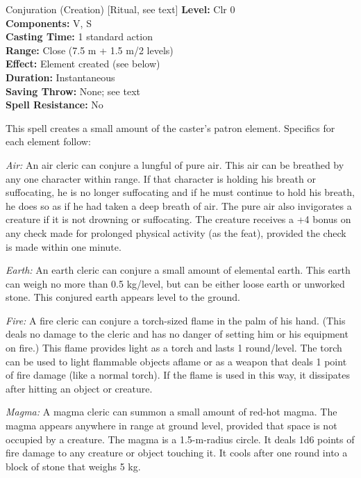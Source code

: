 {Conjuration (Creation) [Ritual, see text]}
{
	\textbf{Level:}
	Clr 0\\
	\textbf{Components:}
	V, S\\
	\textbf{Casting Time:}
	1 standard action\\
	\textbf{Range:}
	Close (7.5 m + 1.5 m/2 levels)\\
	\textbf{Effect:}
	Element created (see below)\\
	\textbf{Duration:}
	Instantaneous\\
	\textbf{Saving Throw:}
	None; see text\\
	\textbf{Spell Resistance:}
	No\\
}
{
	This spell creates a small amount of the caster's patron element. Specifics for each element follow:

	\textit{Air:} An air cleric can conjure a lungful of pure air. This air can be breathed by any one character within range. If that character is holding his breath or suffocating, he is no longer suffocating and if he must continue to hold his breath, he does so as if he had taken a deep breath of air. The pure air also invigorates a creature if it is not drowning or suffocating. The creature receives a +4 bonus on any check made for prolonged physical activity (as the  feat), provided the check is made within one minute.

	\textit{Earth:} An earth cleric can conjure a small amount of elemental earth. This earth can weigh no more than 0.5 kg/level, but can be either loose earth or unworked stone. This conjured earth appears level to the ground.

	\textit{Fire:} A fire cleric can conjure a torch-sized flame in the palm of his hand. (This deals no damage to the cleric and has no danger of setting him or his equipment on fire.) This flame provides light as a torch and lasts 1 round/level. The torch can be used to light flammable objects aflame or as a weapon that deals 1 point of fire damage (like a normal torch). If the flame is used in this way, it dissipates after hitting an object or creature.

	\textit{Magma:} A magma cleric can summon a small amount of red-hot magma. The magma appears anywhere in range at ground level, provided that space is not occupied by a creature. The magma is a 1.5-m-radius circle. It deals 1d6 points of fire damage to any creature or object touching it. It cools after one round into a block of stone that weighs 5 kg.

}
